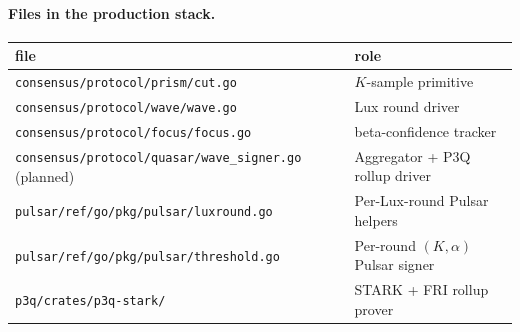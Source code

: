 \paragraph{Files in the production stack.}
\begin{center}\small
\begin{tabular}{l l}
\toprule
file & role \\
\midrule
\texttt{consensus/protocol/prism/cut.go} & $K$-sample primitive \\
\texttt{consensus/protocol/wave/wave.go} & Lux round driver \\
\texttt{consensus/protocol/focus/focus.go} & beta-confidence tracker \\
\texttt{consensus/protocol/quasar/wave\_signer.go} (planned) & Aggregator + P3Q rollup driver \\
\texttt{pulsar/ref/go/pkg/pulsar/luxround.go} & Per-Lux-round Pulsar helpers \\
\texttt{pulsar/ref/go/pkg/pulsar/threshold.go} & Per-round $(K, \alpha)$ Pulsar signer \\
\texttt{p3q/crates/p3q-stark/} & STARK + FRI rollup prover \\
\bottomrule
\end{tabular}
\end{center}
